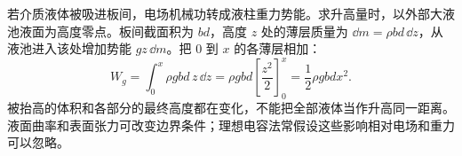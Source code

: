 若介质液体被吸进板间，电场机械功转成液柱重力势能。求升高量时，以外部大液池液面为高度零点。板间截面积为 $bd$，高度 $z$ 处的薄层质量为 $\dd m=\rho bd\,\dd z$，从液池进入该处增加势能 $gz\,\dd m$。把 $0$ 到 $x$ 的各薄层相加：
\[
W_g=\int_0^x \rho gbd\,z\,\dd z
=\rho gbd\left[\frac{z^2}{2}\right]_0^x
=\frac12\rho gbdx^2.
\]
被抬高的体积和各部分的最终高度都在变化，不能把全部液体当作升高同一距离。液面曲率和表面张力可改变边界条件；理想电容法常假设这些影响相对电场和重力可以忽略。


